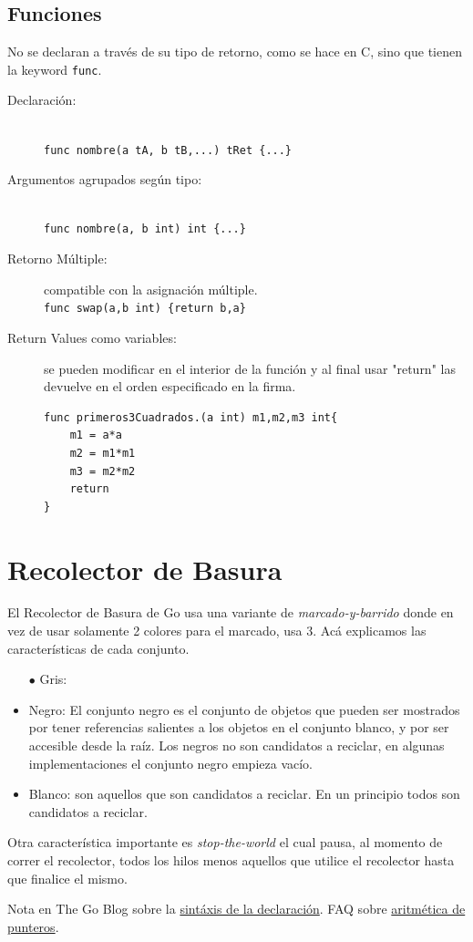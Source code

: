 \documentclass{article}
\begin{document}
\subsection{Funciones}
No se declaran a través de su tipo de retorno, como se hace en C, sino que tienen la keyword \lstinline|func|.
\begin{description}
	\item[Declaración:]\hfill \\
		\lstinline|func nombre(a tA, b tB,...) tRet {...}| 
	\item[Argumentos agrupados según tipo:] \hfill \\
		\lstinline|func nombre(a, b int) int {...}|
	\item[Retorno Múltiple:] compatible con la asignación múltiple. \\
		\lstinline|func swap(a,b int) {return b,a}|
	\item[Return Values como variables:] se pueden modificar en el interior de la función y al final usar "return" las devuelve en el orden especificado en la firma.
\begin{lstlisting}
func primeros3Cuadrados.(a int) m1,m2,m3 int{
	m1 = a*a
	m2 = m1*m1
	m3 = m2*m2
	return
}
\end{lstlisting}
\end{description}

\section{Recolector de Basura}
El Recolector de Basura de Go usa una variante de \textit{marcado-y-barrido} donde en vez de usar solamente 2 colores para el marcado, usa 3. 
Acá explicamos las características de cada conjunto.
\begin{itemize}
	\item[$\bullet$] Gris:
	\item Negro: El conjunto negro es el conjunto de objetos que pueden ser mostrados por tener referencias salientes a los objetos en el conjunto blanco, y por ser accesible desde la raíz. Los negros no son candidatos a reciclar, en algunas implementaciones el conjunto negro empieza vacío. 
	\item Blanco: son aquellos que son candidatos a reciclar. En un principio todos son candidatos a reciclar. 
\end{itemize}

Otra característica importante es \textit{stop-the-world} el cual pausa, al momento de correr el recolector, todos los hilos menos aquellos que utilice el recolector hasta que finalice el mismo. 

\begin{thebibliography}{99}
 Nota en The Go Blog sobre la \href{http://blog.golang.org/gos-declaration-syntax}{sintáxis de la declaración}.
 FAQ sobre \href{https://golang.org/doc/faq#no_pointer_arithmetic}{aritmética de punteros}.
\end{thebibliography}
\end{document}
